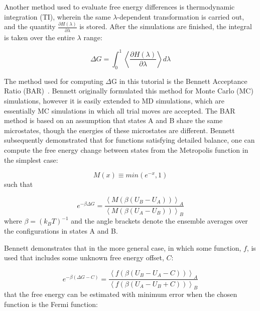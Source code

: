 \documentclass[9pt,tutorial,pubversion]{livecoms}
\begin{document}
Another method used to evaluate free energy differences is thermodynamic integration (TI), wherein the same $\lambda$-dependent transformation is carried out, and the quantity $\frac{\partial H(\lambda)}{\partial \lambda}$ is stored. After the simulations are finished, the integral is taken over the entire $\lambda$ range:

\begin{equation} \label{ti_eq}
\Delta G = \int_{0}^{1} \left\langle \frac{\partial H(\lambda)}{\partial \lambda} \right\rangle d\lambda
\end{equation}

The method used for computing $\Delta$G in this tutorial is the Bennett Acceptance Ratio (BAR)~\cite{Bennett1976}. Bennett originally formulated this method for Monte Carlo (MC) simulations, however it is easily extended to MD simulations, which are essentially MC simulations in which all trial moves are accepted. The BAR method is based on an assumption that states A and B share the same microstates, though the energies of these microstates are different. Bennett subsequently demonstrated that for functions satisfying detailed balance, one can compute the free energy change between states from the Metropolis function in the simplest case:

\begin{equation} \label{metropolis_eq}
M(x) \equiv min(e^{-x}, 1)
\end{equation}
%
such that

\begin{equation} \label{bar_simplest_eq}
e^{-\beta\Delta G} = \frac{\left\langle M\left(\beta\left(U_B - U_A\right)\right)\right\rangle_A}{\left\langle M\left(\beta\left(U_A - U_B\right)\right)\right\rangle_B}
\end{equation}
%
where $\beta = (k_B T)^{-1}$ and the angle brackets denote the ensemble averages over the configurations in states A and B.

Bennett demonstrates that in the more general case, in which some function, $f$, is used that includes some unknown free energy offset, $C$:

\begin{equation} \label{bar_general_eq}
e^{-\beta(\Delta G - C)} = \frac{\left\langle f\left(\beta\left(U_B - U_A - C\right)\right)\right\rangle_A}{\left\langle f\left(\beta\left(U_A - U_B + C\right)\right)\right\rangle_B}
\end{equation}
%
that the free energy can be estimated with minimum error when the chosen function is the Fermi function:
\end{document}
